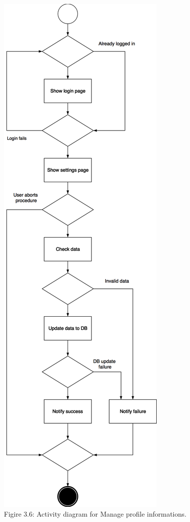 \documentclass{article}
\begin{document}
	\begin{center}
		\includegraphics[scale=0.24]{img/diagrams/manage_profile_informations_ad.png} \\ \bigskip
		Figire 3.6: Activity diagram for Manage profile informations.
	\end{center}
\end{document}
